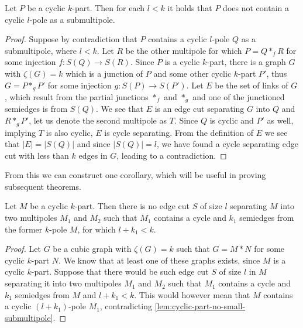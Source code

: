 \documentclass[12pt, twoside]{book}
\begin{document}
\begin{lemma}\label{lem:cyclic-part-no-small-submultipole}
	Let $P$ be a cyclic $k$-part. Then for each $l<k$ it holds that $P$ does not contain a cyclic $l$-pole as a submultipole.
\end{lemma}

\begin{proof}
	Suppose by contradiction that $P$ contains a cyclic $l$-pole $Q$ as a submultipole, where $l<k$. Let $R$ be the other multipole for which $P=Q*_fR$ for some injection $f:S(Q)\rightarrow S(R)$. Since $P$ is a cyclic $k$-part, there is a graph $G$ with $\zeta(G)=k$ which is a junction of $P$ and some other cyclic $k$-part $P'$, thus $G=P*_gP'$ for some injection $g:S(P)\rightarrow S(P')$. Let $E$ be the set of links of $G$, which result from the partial junctions $*_f$ and $*_g$ and one of the junctioned semiedges is from $S(Q)$. We see that $E$ is an edge cut separating $G$ into $Q$ and $R*_gP'$, let us denote the second multipole as $T$. Since $Q$ is cyclic and $P'$ as well, implying $T$ is also cyclic, $E$ is cycle separating. From the definition of $E$ we see that $|E|=|S(Q)|$ and since $|S(Q)|=l$, we have found a cycle separating edge cut with less than $k$ edges in $G$, leading to a contradiction.
\end{proof}

From this we can construct one corollary, which will be useful in proving subsequent theorems.

\begin{corollary}
	Let $M$ be a cyclic $k$-part. Then there is no edge cut $S$ of size $l$ separating $M$ into two multipoles $M_1$ and $M_2$ such that $M_1$ contains a cycle and $k_1$ semiedges from the former $k$-pole $M$, for which $l+k_1 < k$.
\end{corollary}

\begin{proof}
	Let $G$ be a cubic graph with $\zeta(G)=k$ such that $G=M*N$ for some cyclic $k$-part $N$. We know that at least one of these graphs exists, since $M$ is a cyclic $k$-part. Suppose that there would be such edge cut $S$ of size $l$ in $M$ separating it into two multipoles $M_1$ and $M_2$ such that $M_1$ contains a cycle and $k_1$ semiedges from $M$ and $l+k_1 < k$. This would however mean that $M$ contains a cyclic $(l+k_1)$-pole $M_1$, contradicting \cref{lem:cyclic-part-no-small-submultipole}.
\end{proof}
\end{document}
